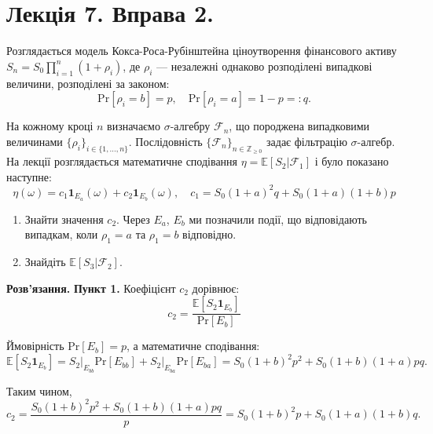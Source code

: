\documentclass{hw_template}
\begin{document}
\newpage

\section{Лекція 7. Вправа 2.}

\begin{problem}
    Розглядається модель Кокса-Роса-Рубінштейна ціноутворення фінансового активу
    $S_n = S_0 \prod_{i=1}^n (1+\rho_i)$, де $\rho_i$ --- незалежні
    однаково розподілені випадкові величини, розподілені за законом:
    \begin{equation*}
        \text{Pr}[\rho_i = b] = p, \quad \text{Pr}[\rho_i=a] = 1-p =: q.
    \end{equation*}

    На кожному кроці $n$ визначаємо $\sigma$-алгебру $\mathcal{F}_n$, що
    породжена випадковими величинами $\{\rho_i\}_{i \in \{1,\dots,n\}}$.
    Послідовність $\{\mathcal{F}_n\}_{n \in \mathbb{Z}_{\geq 0}}$ задає
    фільтрацію $\sigma$-алгебр. На лекції розглядається математичне сподівання
    $\eta = \mathbb{E}[S_2|\mathcal{F}_1]$ і було показано наступне:
    \begin{equation*}
        \eta(\omega) = c_1\mathbf{1}_{E_a}(\omega) + c_2\mathbf{1}_{E_b}(\omega), \quad c_1=S_0(1+a)^2q + S_0(1+a)(1+b)p
    \end{equation*}

    \begin{enumerate}
        \item Знайти значення $c_2$. Через $E_a$, $E_b$ ми позначили події, що
    відповідають випадкам, коли $\rho_1=a$ та $\rho_1=b$ відповідно.
        \item Знайдіть $\mathbb{E}[S_3|\mathcal{F}_2]$.
    \end{enumerate}
\end{problem}

\textbf{Розв'язання.} \textbf{Пункт 1.} Коефіцієнт $c_2$ дорівнює:
\begin{equation*}
    c_2 = \frac{\mathbb{E}[S_2\mathbf{1}_{E_b}]}{\text{Pr}[E_b]}
\end{equation*}

Ймовірність $\text{Pr}[E_b]=p$, а математичне сподівання:
\begin{equation*}
    \mathbb{E}[S_2\mathbf{1}_{E_b}] = S_2\Big|_{E_{bb}}\text{Pr}[E_{bb}] + S_2\Big|_{E_{ba}}\text{Pr}[E_{ba}] = S_0(1+b)^2p^2 + S_0(1+b)(1+a)pq.
\end{equation*}

Таким чином,
\begin{equation*}
    c_2 = \frac{S_0(1+b)^2p^2 + S_0(1+b)(1+a)pq}{p} = S_0(1+b)^2p + S_0(1+a)(1+b)q.
\end{equation*}
\end{document}
